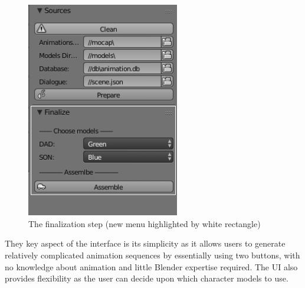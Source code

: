 \begin{figure}[H]
\centerline{\includegraphics[width = 18em]{img/ui_finalize.png}}
\caption{The finalization step (new menu highlighted by white rectangle)}\label{fig:ui_finalize}
\end{figure}

They key aspect of the interface is its simplicity as it allows users to generate relatively complicated animation sequences by essentially using two buttons, with no knowledge about animation and little Blender expertise required. The UI also provides flexibility as the user can decide upon which character models to use.






